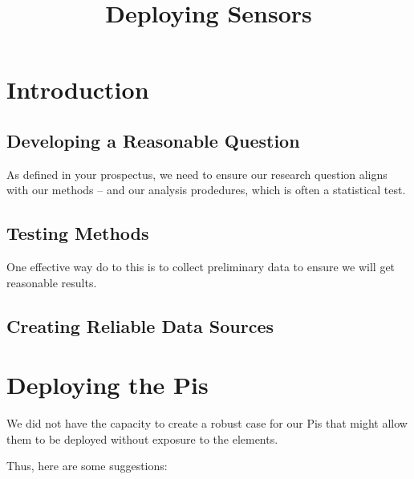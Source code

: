 \documentclass{article}\usepackage[]{graphicx}\usepackage[]{color}
\title{Deploying Sensors}
\begin{document}
\section{Introduction}

\subsection{Developing a Reasonable Question}

As defined in your prospectus, we need to ensure our research question aligns with our methods -- and our analysis prodedures, which is often a statistical test. 

\subsection{Testing Methods}

One effective way do to this is to collect preliminary data to ensure we will get reasonable results. 

\subsection{Creating Reliable Data Sources}

\section{Deploying the Pis}

We did not have the capacity to create a robust case for our Pis that might allow them to be deployed without exposure to the elements. 

Thus, here are some suggestions:
\end{document}
